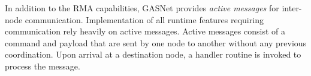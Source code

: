 In addition to the RMA capabilities, GASNet provides {\em active messages} for 
inter-node communication.  Implementation of all runtime features requiring communication
rely heavily on active messages.  Active messages consist of a command and payload that
are sent by one node to another without any previous coordination.  Upon arrival
at a destination node, a handler routine is invoked to process the message.



